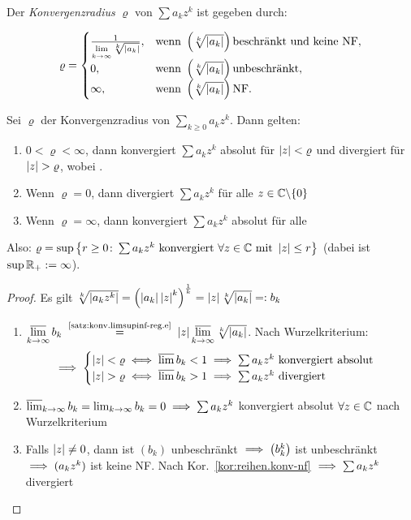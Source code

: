 \documentclass[12pt]{scrreprt}
\begin{document}
\begin{dfn}\label{dfn:reihen.konvradius}
Der \emph{Konvergenzradius} $\varrho$ von $\sum a_kz^k$ ist gegeben durch:

\[\varrho = 
\begin{cases}
	\frac{1}{\lim\limits_{k\rightarrow\infty}\sqrt[k]{\left\lvert a_k\right\lvert}},	& \text{wenn } \left(\sqrt[k]{\left\lvert a_k\right\lvert}\right) \text{beschränkt und keine NF},\\
	0,											& \text{wenn } \left(\sqrt[k]{\left\lvert a_k\right\lvert}\right) \text{unbeschränkt},\\
	\infty,										& \text{wenn } \left(\sqrt[k]{\left\lvert a_k\right\lvert}\right) \text{NF}.
\end{cases}\]
\end{dfn}

\begin{thm}\label{thm:reihen.konvradius}
Sei $\varrho$ der Konvergenzradius von $\sum_{k \ge 0} a_kz^k$. Dann gelten:
\begin{enumerate}
\item $0 < \varrho < \infty$, dann konvergiert $\sum a_kz^k$ absolut für $\left\lvert z\right\lvert < \varrho$
und divergiert für $\left\lvert z\right\lvert > \varrho$, wobei .\label{thm:reihen.konvradius.a}
\item Wenn $\varrho = 0$, dann divergiert $\sum a_kz^k$ für alle $z\in\mathbb{C}\backslash\{0\}$\label{thm:reihen.konvradius.b}
\item Wenn $\varrho = \infty$, dann konvergiert $\sum a_kz^k$ absolut für alle \label{thm:reihen.konvradius.c}
\end{enumerate}
Also: $\varrho = \sup \left\{r \ge 0\colon \sum a_kz^k\text{ konvergiert }\forall z\in\mathbb{C}\text{ mit }\left\lvert z\right\lvert \le r\right\}$ 
(dabei ist $\sup \mathbb{R}_+ := \infty$).
\end{thm}
\begin{proof}
Es gilt $\sqrt[k]{\left\lvert a_kz^k\right\lvert} = \left(\left\lvert a_k\right\lvert\left\lvert z\right\lvert^k\right)^{\frac{1}{k}} = \left\lvert z\right\lvert\sqrt[k]{\left\lvert a_k\right\lvert} =: b_k$
\begin{enumerate}
\item $\ls\limits_{\kinf} b_k \nach{=}{\ref{satz:konv.limsupinf-reg.e}} \abs{z}\ls\limits_{\kinf}\sqrt[k]{\abs{a_k}}$.
Nach Wurzelkriterium: \[\implies \begin{cases}
	\left\lvert z\right\lvert < \varrho \iff \varlimsup b_k < 1 \implies \sum a_kz^k\text{ konvergiert absolut}\\
	\left\lvert z\right\lvert > \varrho \iff \varlimsup b_k > 1 \implies \sum a_kz^k\text{ divergiert}
\end{cases}\]
\item $\varlimsup_{k\rightarrow\infty} b_k = \lim_{k\rightarrow\infty} b_k = 0 \implies \sum a_kz^k$ konvergiert absolut 
$\forall z\in\mathbb{C}$ nach Wurzelkriterium
\item Falls $\left\lvert z\right\lvert \neq 0$, dann ist $(b_k)$ unbeschränkt $\implies \left(b_k^k\right)$ ist unbeschränkt
$\implies (a_kz^k)$ ist keine NF. Nach Kor.~\ref{kor:reihen.konv-nf} $\implies \sum a_kz^k$ divergiert
\end{enumerate}
\end{proof}
\end{document}

